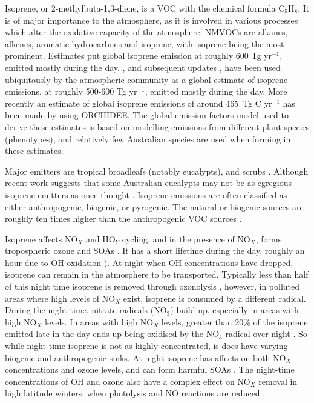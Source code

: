    Isoprene, or 2-methylbuta-1,3-diene, is a VOC with the chemical formula C$_5$H$_8$. 
    It is of major importance to the atmosphere, as it is involved in various processes which alter the oxidative capacity of the atmosphere.
    NMVOCs are alkanes, alkenes, aromatic hydrocarbons and isoprene, with isoprene being the most prominent.
    Estimates put global isoprene emission at roughly 600 Tg yr$^{-1}$, emitted mostly during the day.
    \cite{Guenther1995}, and subsequent updates \citep{Guenther2000,Guenther2006}, have been used ubiquitously by the atmospheric community as a global estimate of isoprene emissions, at roughly 500-600 Tg yr$^{-1}$, emitted mostly during the day.
    More recently an estimate of global isoprene emissions of around 465~Tg C yr$^{-1}$ has been made by \cite{Messina2016} using ORCHIDEE.
    The global emission factors model used to derive these estimates is based on modelling emissions from different plant species (phenotypes), and relatively few Australian species are used when forming in these estimates.
    
    Major emitters are tropical broadleafs (notably eucalypts), and scrubs \citep{Guenther2006, Arneth2008, Niinemets2010, Monks2015}.
    Although recent work suggests that some Australian eucalypts may not be as egregious isoprene emitters as once thought \citet{Emmerson2016}.
    Isoprene emissions are often classified as either anthropogenic, biogenic, or pyrogenic.
    The natural or biogenic sources are roughly ten times higher than the anthropogenic VOC sources \citep{Guenther2006, Kanakidou2005}.
    
    Isoprene affects NO$_X$ and HO$_Y$ cycling, and in the presence of NO$_X$, forms tropospheric ozone and SOAs \citep{Wagner2002, Millet2006}.
    It has a short lifetime during the day, roughly an hour due to OH oxidation \citep{AtkinsonArey2003}).
    At night when OH concentrations have dropped, isoprene can remain in the atmosphere to be transported. 
    Typically less than half of this night time isoprene is removed through ozonolysis \citep{AtkinsonArey2003}, however, in polluted areas where high levels of NO$_X$ exist, isoprene is consumed by a different radical.
    During the night time, nitrate radicals (NO$_3$) build up, especially in areas with high NO$_X$ levels.
    In areas with high NO$_X$ levels, greater than 20\% of the isoprene emitted late in the day ends up being oxidised by the NO$_3$ radical over night \citep{Brown2009}.
    So while night time isoprene is not as highly concentrated, is does have varying biogenic and anthropogenic sinks.
    At night isoprene has affects on both NO$_X$ concentrations and ozone levels, and can form harmful SOAs \citep{Brown2009, Mao2013}.
    The night-time  concentrations of OH and ozone also have a complex effect on NO$_X$ removal in high latitude winters, when photolysis and NO reactions are reduced \citep{Ayers2006}.
    
